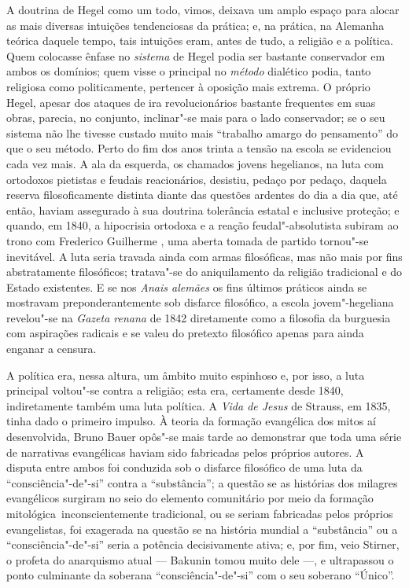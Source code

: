 A doutrina de Hegel como
um todo, vimos, deixava um amplo espaço para alocar as mais diversas
intuições tendenciosas da prática; e, na
prática, na Alemanha teórica daquele tempo, tais intuições eram, antes
de tudo, a religião e a política. Quem colocasse ênfase
no \emph{sistema} de Hegel
podia ser bastante conservador em ambos os domínios; quem visse o
principal no \emph{método} dialético podia, tanto religiosa como
politicamente, pertencer à oposição mais extrema. O
próprio Hegel,
apesar dos ataques de ira revolucionários bastante frequentes em suas
obras, parecia, no conjunto, inclinar"-se mais para o lado conservador;
se o seu sistema não lhe tivesse custado muito mais ``trabalho amargo do
pensamento'' do que o seu método. Perto do fim dos anos trinta a tensão
na escola se evidenciou cada vez mais. A ala da esquerda, os chamados
jovens hegelianos, na luta com ortodoxos pietistas e feudais
reacionários, desistiu, pedaço por pedaço, daquela reserva
filosoficamente distinta diante das questões ardentes do dia a dia que,
até então, haviam assegurado à sua doutrina tolerância estatal e
inclusive proteção; e quando, em 1840, a hipocrisia 
ortodoxa e a reação feudal"-absolutista subiram ao trono com Frederico
Guilherme , uma aberta tomada de partido tornou"-se inevitável. A luta
seria travada ainda com armas filosóficas, mas não mais por fins
abstratamente filosóficos; tratava"-se do aniquilamento
da religião tradicional e do Estado existentes. E se 
nos \emph{Anais alemães}
os fins últimos práticos ainda se mostravam 
preponderantemente sob disfarce filosófico, a escola jovem"-hegeliana
revelou"-se na \emph{Gazeta renana }de 1842 diretamente como a filosofia
da burguesia com aspirações radicais e se valeu do pretexto filosófico
apenas para ainda enganar a censura.

A política era, nessa altura, um âmbito muito espinhoso e, por isso, a
luta principal voltou"-se contra a religião; esta era, certamente desde
1840, indiretamente também uma luta política.
A \emph{Vida de Jesus} de Strauss,
em 1835, tinha dado o primeiro impulso. À teoria da formação evangélica
dos mitos aí desenvolvida,
Bruno Bauer opôs"-se mais tarde ao demonstrar que toda uma série de narrativas
evangélicas haviam sido fabricadas pelos próprios autores. A disputa
entre ambos foi conduzida sob o disfarce filosófico de uma luta da
``consciência"-de"-si'' contra a ``substância''; a questão se as histórias
dos milagres evangélicos surgiram no seio do elemento comunitário
por meio da formação mitológica\est\ inconscientemente 
tradicional, ou se seriam fabricadas pelos próprios evangelistas, foi
exagerada na questão se na história mundial a ``substância'' ou a
``consciência"-de"-si'' seria a potência decisivamente 
ativa; e, por fim, veio Stirner,
o profeta do anarquismo atual --- Bakunin tomou muito dele ---, e ultrapassou
o ponto culminante da soberana ``consciência"-de"-si'' com o seu soberano
``Único''.

